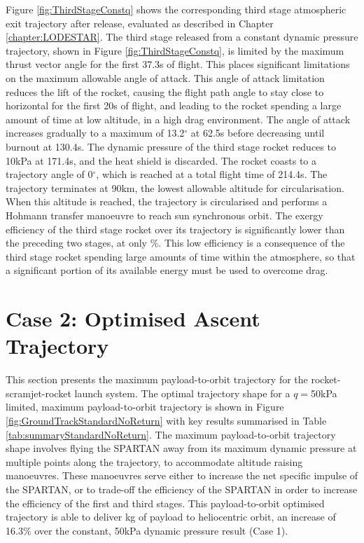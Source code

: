 Figure \ref{fig:ThirdStageConstq} shows the corresponding third stage atmospheric exit trajectory after release, evaluated as described in Chapter \ref{chapter:LODESTAR}. The third stage released from a constant dynamic pressure trajectory, shown in Figure \ref{fig:ThirdStageConstq}, is limited by the maximum thrust vector angle for the first 37.3s of flight. This places significant limitations on the maximum allowable angle of attack. This angle of attack limitation reduces the lift of the rocket, causing the flight path angle to stay close to horizontal for the first 20s of flight, and leading to the rocket spending a large amount of time at low altitude, in a high drag environment. The angle of attack increases gradually to a maximum of 13.2$^\circ$ at 62.5s before decreasing until burnout at 130.4s. The dynamic pressure of the third stage rocket reduces to 10kPa at 171.4s, and the heat shield is discarded. The rocket coasts to a trajectory angle of 0$^\circ$, which is reached at a total flight time of 214.4s. The trajectory terminates at 90km, the lowest allowable altitude for circularisation. 
When this altitude is reached, the trajectory is circularised and performs a Hohmann transfer manoeuvre to reach sun synchronous orbit.
The exergy efficiency of the third stage rocket over its trajectory is significantly lower than the preceding two stages, at only \thirddExergyEffConstq \%. This low efficiency is a consequence of the third stage rocket spending large amounts of time within the atmosphere, so that a significant portion of its available energy must be used to overcome drag.  







\section{Case 2: Optimised Ascent Trajectory}\label{sec:optimisednoreturn}


This section presents the maximum payload-to-orbit trajectory for the rocket-scramjet-rocket launch system. 
The optimal trajectory shape for a $q=$50kPa limited, maximum payload-to-orbit trajectory is shown in Figure \ref{fig:GroundTrackStandardNoReturn} with key results summarised in Table \ref{tab:summaryStandardNoReturn}. The maximum payload-to-orbit trajectory shape involves flying the SPARTAN away from its maximum dynamic pressure at multiple points along the trajectory, to accommodate altitude raising manoeuvres. These manoeuvres serve either to increase the net specific impulse of the SPARTAN, or to trade-off the efficiency of the SPARTAN in order to increase the efficiency of the first and third stages. 
This payload-to-orbit optimised trajectory is able to deliver \PayloadToOrbitStandardNoReturn kg of payload to heliocentric orbit, an increase of 16.3\% over the constant, 50kPa dynamic pressure result (Case 1).

